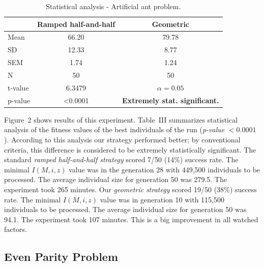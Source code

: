 \documentclass[conference]{IEEEtran}
\begin{document}
\begin{table}[!t]
\caption{Statistical analysis - Artificial ant problem.}
\centering
\begin{tabular}{|l|cc|}
\hline
& Ramped half-and-half & Geometric \\
\hline
Mean & 66.20 & 79.78 \\
SD	 & 12.33 & 8.77  \\
SEM	 & 1.74	 & 1.24  \\
N	 & 50    & 50    \\
\hline
t-value &  6.3479           & $\alpha = 0.05$\\
p-value &  \textless 0.0001 &  \textbf{Extremely stat. significant.}\\
\hline
\end{tabular}
\end{table}


Figure~2 shows results of this experiment. 
Table~III summarizes statistical analysis
of the fitness values of the best individuals of the run 
(\textit{p-value} $ < 0.0001$).  
According to this analysis our strategy performed better;
by conventional criteria, this difference is considered to be extremely statistically significant.
The standard \textit{ramped half-and-half strategy} scored 7/50 (14\%) success rate. 
The minimal $I(M,i,z)$ value was in the generation 28 with 449,500 individuals to be processed.
The average individual size for generation 50 was 279.5.
The experiment took 265 minutes.
Our \textit{geometric strategy} scored 19/50 (38\%) success rate. 
The minimal $I(M,i,z)$ value was in generation 10 with 115,500 individuals to be processed.
The average individual size for generation 50 was 94.1.
The experiment took 107 minutes.
This is a big improvement in all watched factors.

\subsection{Even Parity Problem}
\end{document}
